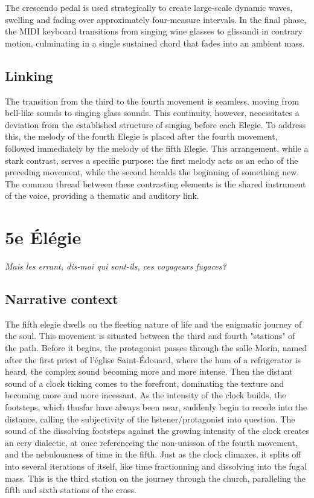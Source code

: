 \documentclass[12pt,twoside,maitrise]{dms_ks}
\theoremstyle{definition}
\begin{document}
The crescendo pedal is used strategically to create large-scale dynamic waves, swelling and fading over approximately four-measure intervals.
In the final phase, the MIDI keyboard transitions from singing wine glasses to glissandi in contrary motion, culminating in a single sustained chord that fades into an ambient mass.


\subsection{Linking}

The transition from the third to the fourth movement is seamless, moving from bell-like sounds to singing glass sounds.
This continuity, however, necessitates a deviation from the established structure of singing before each Elegie.
To address this, the melody of the fourth Elegie is placed after the fourth movement, followed immediately by the melody of the fifth Elegie.
This arrangement, while a stark contrast, serves a specific purpose: the first melody acts as an echo of the preceding movement, while the second heralds the beginning of something new.
The common thread between these contrasting elements is the shared instrument of the voice, providing a thematic and auditory link.

\section{5e Élégie}

\epigraph{\textit{Mais les errant, dis-moi qui sont-ils, ces voyageurs fugaces?}}{}

\subsection{Narrative context}

The fifth elegie dwells on the fleeting nature of life and the enigmatic journey of the soul.
This movement is situated between the third and fourth "stations" of the path.
Before it begins, the protagonist passes through the salle Morin, named after the first priest of l'église Saint-Édouard, where the hum of a refrigerator is heard, the complex sound becoming more and more intense.
Then the distant sound of a clock ticking comes to the forefront, dominating the texture and becoming more and more incessant.
As the intensity of the clock builds, the footsteps, which thusfar have always been near, suddenly begin to recede into the distance, calling the subjectivity of the listener/protagonist into question.
The sound of the dissolving footsteps against the growing intensity of the clock creates an eery dialectic, at once referenceing the non-unisson of the fourth movement, and the nebulousness of time in the fifth.
Just as the clock climaxes, it splits off into several iterations of itself, like time fractionning and dissolving into the fugal mass.
This is the third station on the journey through the church, paralleling the fifth and sixth stations of the cross.
\end{document}
